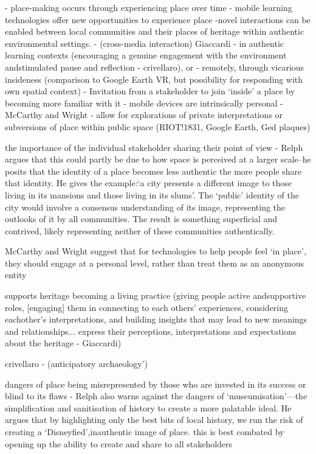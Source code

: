 - place-making occurs through experiencing place over time - mobile learning technologies offer new opportunities to experience place
    -novel interactions can be enabled between local communities and their places of heritage within authentic environmental settings. - (cross-media interaction) Giaccardi
    - in authentic learning contexts (encouraging a genuine engagement with the environment andstimulated pause and reflection - crivellaro), or
    - remotely, through vicarious insideness (comparison to Google Earth VR, but possibility for responding with own spatial context)
    - Invitation from a stakeholder to join `inside' a place by becoming more familiar with it
    - mobile devices are intrinsically personal - McCarthy and Wright 
    - allow for explorations of private interpretations or subversions of place within public space (RIOT!1831, Google Earth, Ged plaques)


the importance of the individual stakeholder sharing their point of view - Relph argues that this could partly be due to how space is perceived at a larger scale–he posits that the identity of a place becomes less authentic the more people share that identity.  He gives the example:‘a city presents a different image to those living in its mansions and those living in its slums’. The ‘public’ identity of the city would involve a consensus understanding of its image, representing the outlooks of it by all communities. The result is something superficial and contrived, likely representing neither of these communities authentically.

McCarthy and Wright suggest that for technologies to help people feel ‘in place’, they should engage at a personal level, rather than treat them as an anonymous entity

supports heritage becoming a living practice (giving people active andsupportive roles, [engaging] them in connecting to each others’ experiences, considering eachother’s interpretations, and building insights that may lead to new meanings and relationships... express their perceptions, interpretations and expectations about the heritage - Giaccardi)

crivellaro - (anticipatory archaeology’)

dangers of place being misrepresented by those who are invested in its success or blind to its flaws -  Relph also warns against the dangers of ‘museumisation’—the simplification and sanitisation of history to create a more palatable ideal.  He argues that by highlighting only the best bits of local history, we run the risk of creating a ‘Disneyfied’,inauthentic image of place.
this is best combated by opening up the ability to create and share to all stakeholders

